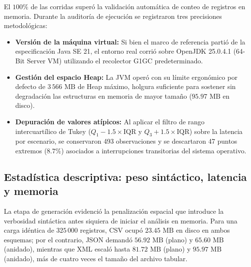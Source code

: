 El $100\%$ de las corridas superó la validación automática de conteo de registros en memoria. Durante la auditoría de ejecución se registraron tres precisiones metodológicas:
\begin{itemize}
    \item \textbf{Versión de la máquina virtual:} Si bien el marco de referencia partió de la especificación Java SE 21, el entorno real corrió sobre OpenJDK 25.0.4.1 (64-Bit Server VM) utilizando el recolector G1GC predeterminado.
    \item \textbf{Gestión del espacio Heap:} La JVM operó con su límite ergonómico por defecto de $3\,566\text{ MB}$ de Heap máximo, holgura suficiente para sostener sin degradación las estructuras en memoria de mayor tamaño ($95.97\text{ MB}$ en disco).
    \item \textbf{Depuración de valores atípicos:} Al aplicar el filtro de rango intercuartílico de Tukey ($Q_{1} - 1.5 \times \text{IQR}$ y $Q_{3} + 1.5 \times \text{IQR}$) sobre la latencia por escenario, se conservaron 493 observaciones y se descartaron 47 puntos extremos ($8.7\%$) asociados a interrupciones transitorias del sistema operativo.
\end{itemize}

\subsection{Estadística descriptiva: peso sintáctico, latencia y memoria}

La etapa de generación evidenció la penalización espacial que introduce la verbosidad sintáctica antes siquiera de iniciar el análisis en memoria. Para una carga idéntica de $325\,000$ registros, CSV ocupó $23.45\text{ MB}$ en disco en ambos esquemas; por el contrario, JSON demandó $56.92\text{ MB}$ (plano) y $65.60\text{ MB}$ (anidado), mientras que XML escaló hasta $81.72\text{ MB}$ (plano) y $95.97\text{ MB}$ (anidado), más de cuatro veces el tamaño del archivo tabular.

